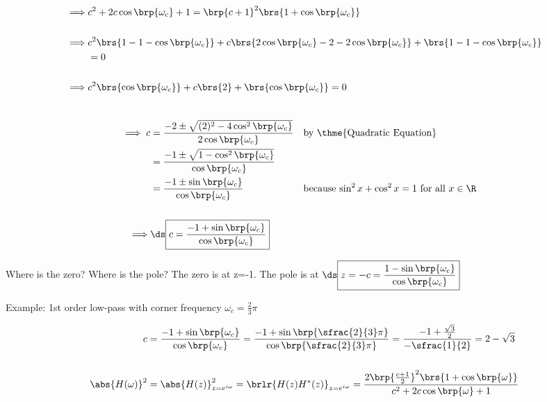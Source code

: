 {\begin{align*}
    \implies &c^2 + 2 c\cos\brp{\omega_c} + 1 
             = \brp{c+1}^2\brs{1 +  \cos\brp{\omega_c}}
  \\\\\implies & c^2\brs{1-1-\cos\brp{\omega_c}} 
             + c  \brs{2\cos\brp{\omega_c}-2-2\cos\brp{\omega_c}}
             +    \brs{1-1-\cos\brp{\omega_c}}
             \\&= 0
  \\\\\implies & c^2\brs{\cos\brp{\omega_c}} 
             + c  \brs{2}
             +    \brs{\cos\brp{\omega_c}}
             = 0
\end{align*}}



{\begin{align*}
  \\\implies c &= \frac{-2 \pm \sqrt{(2)^2 -4\cos^2\brp{\omega_c}}}
                       {2\cos\brp{\omega_c}}
               && \text{by \thme{Quadratic Equation}}
             \\&= \frac{-1 \pm \sqrt{1 -\cos^2\brp{\omega_c}}}
                       {\cos\brp{\omega_c}}
             \\&= \frac{-1 \pm \sin\brp{\omega_c}}
                       {\cos\brp{\omega_c}}
               && \text{because $\sin^2x + \cos^2x = 1$ for all $x\in\R$}
  \\
  \\\implies &\ds\boxed{c = \frac{-1 + \sin\brp{\omega_c}}
                    {\cos\brp{\omega_c}}}
\end{align*}}

Where is the zero? Where is the pole?
The zero is at z=-1. \qquad The pole is at 
$\ds\boxed{z=-c = \frac{1 - \sin\brp{\omega_c}}
                    {\cos\brp{\omega_c}}}$

\newpage
Example: 1st order low-pass with corner frequency $\omega_c=\frac{2}{3}\pi$

{\begin{align*}
  c &= \frac{-1 + \sin\brp{\omega_c}}{\cos\brp{\omega_c}}
     = \frac{-1 + \sin\brp{\sfrac{2}{3}\pi}}{\cos\brp{\sfrac{2}{3}\pi}}
     = \frac{-1 + \frac{\sqrt{3}}{2}}{-\sfrac{1}{2}}
     = 2 - \sqrt{3}
  \\
  \\
  \abs{H(\omega)}^2
    &= \abs{H(z)}^2_{z=e^{i\omega}}
     = \brlr{H(z)H^\ast(z)}_{z=e^{i\omega}}
     = \frac{2\brp{\frac{c+1}{2}}^2\brs{1 +  \cos\brp{\omega}}}
            {c^2 + 2 c\cos\brp{\omega} + 1}
\end{align*}}

